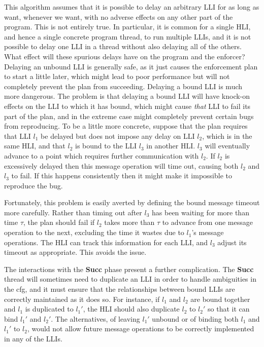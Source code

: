 This algorithm assumes that it is possible to delay an arbitrary LLI
for as long as want, whenever we want, with no adverse effects on any
other part of the program.  This is not entirely true.  In particular,
it is common for a single HLI, and hence a single concrete program
thread, to run multiple LLIs, and it is not possible to delay one LLI
in a thread without also delaying all of the others.  What effect will
these spurious delays have on the program and the enforcer?  Delaying
an unbound LLI is generally safe, as it just causes the enforcement
plan to start a little later, which might lead to poor performance but
will not completely prevent the plan from succeeding.  Delaying a
bound LLI is much more dangerous.  The problem is that delaying a
bound LLI will have knock-on effects on the LLI to which it has bound,
which might cause \emph{that} LLI to fail its part of the plan, and in
the extreme case might completely prevent certain bugs from
reproducing.  To be a little more concrete, suppose that the plan
requires that LLI $l_1$ be delayed but does not impose any delay on
LLI $l_2$, which is in the same HLI, and that $l_2$ is bound to the
LLI $l_3$ in another HLI.  $l_3$ will eventually advance to a point
which requires further communication with $l_2$.  If $l_2$ is
excessively delayed then this message operation will time out, causing
both $l_2$ and $l_3$ to fail.  If this happens consistently then it
might make it impossible to reproduce the bug.

Fortunately, this problem is easily averted by defining the bound
message timeout more carefully.  Rather than timing out after $l_3$
has been waiting for more than time $\tau$, the plan should fail if
$l_2$ takes more than $\tau$ to advance from one message operation to
the next, excluding the time it wastes due to $l_1$'s message
operations.  The HLI can track this information for each LLI, and
$l_3$ adjust its timeout as appropriate.  This avoids the
issue.

The interactions with the \textbf{Succ} phase present a further
complication.  The \textbf{Succ} thread will sometimes need to
duplicate an LLI in order to handle ambiguities in the \gls{cfg}, and it
must ensure that the relationships between bound LLIs are correctly
maintained as it does so.  For instance, if $l_1$ and $l_2$ are bound
together and $l_1$ is duplicated to $l_1'$, the HLI should also
duplicate $l_2$ to $l_2'$ so that it can bind $l_1'$ and $l_2'$.  The
alternatives, of leaving $l_1'$ unbound or of binding both $l_1$ and
$l_1'$ to $l_2$, would not allow future message operations to be
correctly implemented in any of the LLIs.

